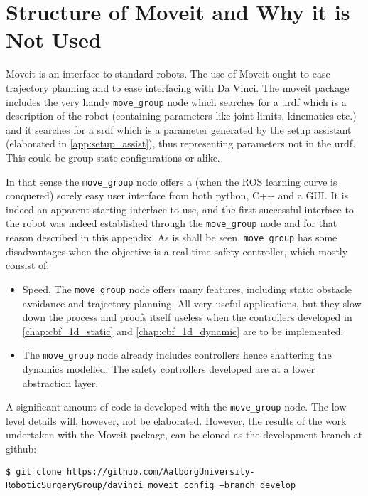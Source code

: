 \section{Structure of Moveit and Why it is Not Used}\label{sec:moveit}
Moveit is an interface to standard robots. The use of Moveit ought to ease trajectory planning and to ease interfacing with Da Vinci. The moveit package includes the very handy \texttt{move\_group} node which searches for a \gls{urdf} which is a description of the robot (containing parameters like joint limits, kinematics etc.) and it searches for a \gls{srdf} which is 	a parameter generated by the setup assistant (elaborated in \autoref{app:setup_assist}), thus representing parameters not in the \gls{urdf}. This could be group state configurations or alike.

In that sense the \texttt{move\_group} node offers a (when the ROS learning curve is conquered) sorely easy user interface from both python, C++ and a GUI. It is indeed an apparent starting interface to use, and the first successful interface to the robot was indeed established through the \texttt{move\_group} node and for that reason described in this appendix. As is shall be seen, \texttt{move\_group} has some disadvantages when the objective is a real-time safety controller, which mostly consist of:
\begin{itemize}
\item Speed. The \texttt{move\_group} node offers many features, including static obstacle avoidance and trajectory planning. All very useful applications, but they slow down the process and proofs itself useless when the controllers developed in \autoref{chap:cbf_1d_static} and \autoref{chap:cbf_1d_dynamic} are to be implemented.
\item The \texttt{move\_group} node already includes controllers hence shattering the dynamics modelled. The safety controllers developed are at a lower abstraction layer.
\end{itemize}
A significant amount of code is developed with the \texttt{move\_group} node. The low level details will, however, not be elaborated. However, the results of the work undertaken with the Moveit package, can be cloned as the development branch at github:

\hspace{0cm} \texttt{\$ git clone https://github.com/AalborgUniversity-RoboticSurgeryGroup/davinci\_moveit\_config ---branch develop} \ \ \ {}

